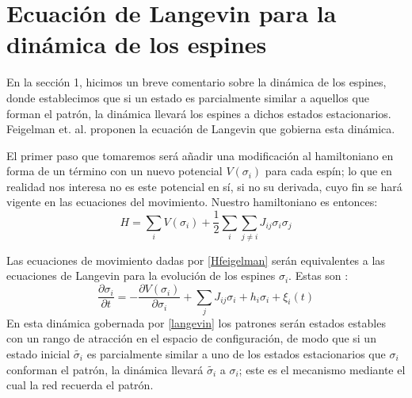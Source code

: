 \documentclass[titlepage,12pt]{article}
\numberwithin{equation}{section}
\begin{document}
	\section{Ecuación de Langevin para la dinámica de los espines}
	En la sección 1, hicimos un breve comentario sobre la dinámica de los espines, donde establecimos que si un estado es parcialmente similar a aquellos que forman el patrón, la dinámica llevará los espines a dichos estados estacionarios. Feigelman et. al. \cite{feigelman86} proponen la ecuación de Langevin que gobierna esta dinámica. 
	
	El primer paso que tomaremos será añadir una modificación al hamiltoniano en forma de un término con un nuevo potencial $V(\sigma_i)$ para cada espín; lo que en realidad nos interesa no es este potencial en sí, si no su derivada, cuyo fin se hará vigente en las ecuaciones del movimiento. Nuestro hamiltoniano es entonces:
	\begin{equation}
	H = \sum_i V(\sigma_i) + \frac{1}{2}\sum_{i}\sum_{j\neq i}J_{ij}\sigma_i\sigma_j
	\label{Hfeigelman}
	\end{equation}
	
	Las ecuaciones de movimiento dadas por \eqref{Hfeigelman} serán equivalentes a las ecuaciones de Langevin para la evolución de los espines $\sigma_i$. Estas son \cite{feigelman86}:
	\begin{equation}
	\frac{\partial\sigma_i}{\partial t} = -\frac{\partial V(\sigma_i)}{\partial\sigma_i} + \sum_j J_{ij}\sigma_i + h_i\sigma_i + \xi_i(t)
	\label{langevin}
	\end{equation}
	En esta dinámica gobernada por \eqref{langevin} los patrones serán estados estables con un rango de atracción en el espacio de configuración, de modo que si un estado inicial $\tilde{\sigma_i}$ es parcialmente similar a uno de los estados estacionarios que $\sigma_i$ conforman el patrón, la dinámica llevará $\tilde{\sigma_i}$ a $\sigma_i$; este es el mecanismo mediante el cual la red recuerda el patrón.\\
	
\end{document}
